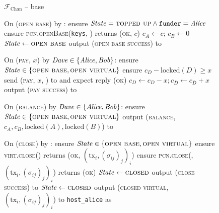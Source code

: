 \begin{figure}[H]
  \begin{systembox}{$\mathcal{F}_{\mathrm{Chan}}$ -- base}
    \begin{algorithmic}[1]
      \State On (\textsc{open base}) by \alice:
      \Indent
        \State ensure $\mathit{State} = \textsc{topped up} \wedge
        \mathtt{funder} = \mathit{Alice}$
        \State ensure \textsc{pcn.openBase}(\texttt{keys}, \bob) returns
        (\textsc{ok}, $c$)
        \State $c_A \gets c$; $c_B \gets 0$
        \State $\mathit{State} \gets \textsc{open base}$
        \State output (\textsc{open base success}) to \alice
      \EndIndent
      \Statex

      \State On (\textsc{pay}, $x$) by $\mathit{Dave} \in \{\mathit{Alice}, \mathit{Bob}\}$:
      \Indent
        \State ensure $\mathit{State} \in \{\textsc{open base}, \textsc{open
        virtual}\}$
        \State ensure $c_D - \mathrm{locked}(D) \geq x$
        \State send (\textsc{pay}, $x$, \dave) to \adversary and expect reply
        (\textsc{ok}) 
        \State $c_D \gets c_D - x; c_{\bar{D}} \gets c_{\bar{D}} + x$
        \State output (\textsc{pay success}) to \dave
      \EndIndent
      \Statex

      \State On (\textsc{balance}) by $\mathit{Dave} \in \{\mathit{Alice}, \mathit{Bob}\}$:
      \Indent
        \State ensure $\mathit{State} \in \{\textsc{open base}, \textsc{open
        virtual}\}$
        \label{code:functionality:chan:skeleton:base:balance:start}
        \State output (\textsc{balance}, $c_A, c_B, \mathrm{locked}(A),
        \mathrm{locked}(B)$) to \dave
        \label{code:functionality:chan:skeleton:base:balance:end}
      \EndIndent
      \Statex

      \State On (\textsc{close}) by \alice:
      \Indent
        \State ensure $\mathit{State} \in \{\textsc{open base}, \textsc{open
        virtual}\}$
        \label{code:functionality:chan:skeleton:close:start}
        \State ensure \textsc{virt.close}(\alice) returns (\textsc{ok},
        $(\mathrm{tx}_i, (\sigma_{ij})_j)_i$) 
          \State ensure \textsc{pcn.close}(\alice, $(\mathrm{tx}_i,
          (\sigma_{ij})_j)_i$) returns (\textsc{ok})
          \State $\mathit{State} \gets \textsc{closed}$
          \State output (\textsc{close success}) to \alice
        \Else \: 
          \State $\mathit{State} \gets \textsc{closed}$
          \State output (\textsc{closed virtual}, $(\mathrm{tx}_i,
          (\sigma_{ij})_j)_i$) to \texttt{host\_alice} as \alice
        \EndIf
        \label{code:functionality:chan:skeleton:close:end}
      \EndIndent
      \Statex


\end{algorithmic}
\end{systembox}
\end{figure}
